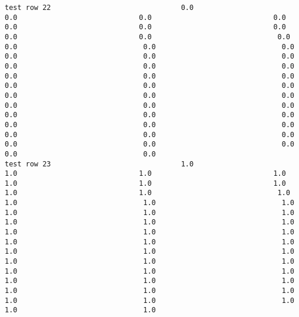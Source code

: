 \documentclass[11pt]{article}
\begin{document}
\begin{verbatim}
test row 22                               0.0                             0.0                             0.0                             0.0                             0.0                             0.0                             0.0                             0.0                             0.0                              0.0                              0.0                              0.0                              0.0                              0.0                              0.0                              0.0                              0.0                              0.0                              0.0                              0.0                              0.0                              0.0                              0.0                              0.0                              0.0                              0.0                              0.0                              0.0                              0.0                              0.0                              0.0                              0.0                              0.0                              0.0                              0.0                              0.0                              0.0                              0.0                              0.0                              0.0                              0.0                              0.0                              0.0                              0.0                              0.0
test row 23                               1.0                             1.0                             1.0                             1.0                             1.0                             1.0                             1.0                             1.0                             1.0                              1.0                              1.0                              1.0                              1.0                              1.0                              1.0                              1.0                              1.0                              1.0                              1.0                              1.0                              1.0                              1.0                              1.0                              1.0                              1.0                              1.0                              1.0                              1.0                              1.0                              1.0                              1.0                              1.0                              1.0                              1.0                              1.0                              1.0                              1.0                              1.0                              1.0                              1.0                              1.0                              1.0                              1.0                              1.0                              1.0

\end{verbatim}
\end{document}

